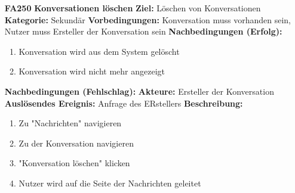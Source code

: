 \documentclass[parskip=full]{scrartcl}
\begin{document}
\begin{itemize}[nosep]
			
			\item[\textbf{FA250}]\textbf{ Konversationen löschen}
			\newline \textbf{Ziel:} Löschen von Konversationen
			\newline \textbf{Kategorie:} Sekundär
			\newline \textbf{Vorbedingungen:} Konversation muss vorhanden sein, Nutzer muss Ersteller der Konversation sein
			\newline \textbf{Nachbedingungen (Erfolg):} 
			\begin{enumerate}[nosep]
				\item Konversation wird aus dem System gelöscht
				\item Konversation wird nicht mehr angezeigt 
			\end{enumerate}
			\textbf{Nachbedingungen (Fehlschlag):}
			\newline \textbf{Akteure:} Ersteller der Konversation
			\newline \textbf{Auslösendes Ereignis:} Anfrage des ERstellers
			\newline \textbf{Beschreibung:}
			\begin{enumerate}[nosep]
				\item Zu "Nachrichten" navigieren
				\item Zu der Konversation navigieren
				\item "Konversation löschen" klicken
				\item Nutzer wird auf die Seite der Nachrichten geleitet\\
			\end{enumerate}							
		\end{itemize}
		
\end{document}
